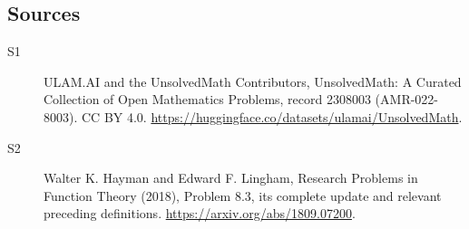 \documentclass[11pt]{article}
\begin{document}
\subsection{Sources}
\begin{description}
\item[\hypertarget{source:2308003:1}{S1}] ULAM.AI and the UnsolvedMath Contributors, UnsolvedMath: A Curated Collection of Open Mathematics Problems, record 2308003 (AMR-022-8003). CC BY 4.0. \url{https://huggingface.co/datasets/ulamai/UnsolvedMath}.
\item[\hypertarget{source:2308003:2}{S2}] Walter K. Hayman and Edward F. Lingham, Research Problems in Function Theory (2018), Problem 8.3, its complete update and relevant preceding definitions. \url{https://arxiv.org/abs/1809.07200}.
\end{description}
\label{end:2308003}
\end{document}

